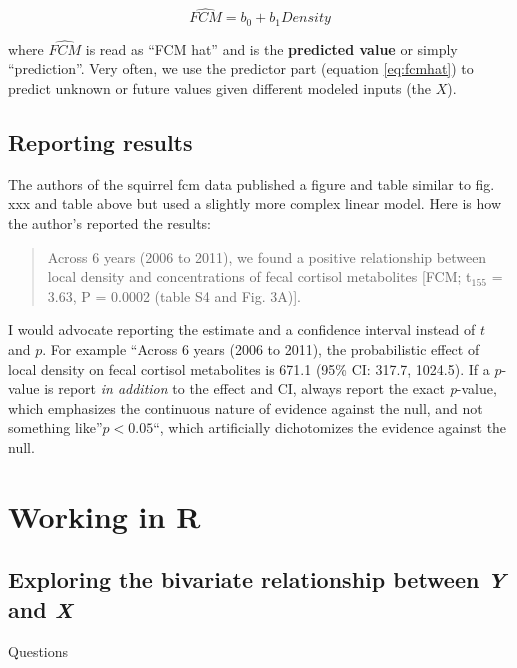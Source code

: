 \documentclass[]{book}
\begin{document}
\begin{equation}
\widehat{FCM} = b_0 + b_1 Density
\label{eq:fcmhat}
\end{equation}

where \(\widehat{FCM}\) is read as ``FCM hat'' and is the
\textbf{predicted value} or simply ``prediction''. Very often, we use
the predictor part (equation \eqref{eq:fcmhat}) to predict unknown or
future values given different modeled inputs (the \(X\)).

\subsection{Reporting results}\label{reporting-results}

The authors of the squirrel fcm data published a figure and table
similar to fig. xxx and table above but used a slightly more complex
linear model. Here is how the author's reported the results:

\begin{quote}
Across 6 years (2006 to 2011), we found a positive relationship between
local density and concentrations of fecal cortisol metabolites {[}FCM;
t\(_155\) = 3.63, P = 0.0002 (table S4 and Fig. 3A){]}.
\end{quote}

I would advocate reporting the estimate and a confidence interval
instead of \(t\) and \(p\). For example ``Across 6 years (2006 to 2011),
the probabilistic effect of local density on fecal cortisol metabolites
is 671.1 (95\% CI: 317.7, 1024.5). If a \(p\)-value is report \emph{in
addition} to the effect and CI, always report the exact \emph{p}-value,
which emphasizes the continuous nature of evidence against the null, and
not something like''\(p < 0.05\)``, which artificially dichotomizes the
evidence against the null.

\section{Working in R}\label{working-in-r}

\subsection{\texorpdfstring{Exploring the bivariate relationship between
\emph{Y} and
\emph{X}}{Exploring the bivariate relationship between Y and X}}\label{exploring-the-bivariate-relationship-between-y-and-x}

Questions
\end{document}
